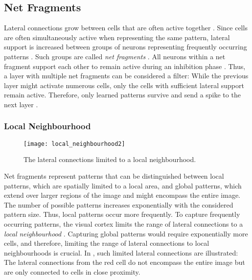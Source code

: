 \subsection{Net Fragments}
Lateral connections grow between cells that are often active together .
Since cells are often simultaneously active when representing the same pattern, lateral support is increased between groups of neurons representing frequently occurring patterns \cite{stettler_lateral_2002}. Such groups are called \emph{net fragments} .
All neurons within a net fragment support each other to remain active during an inhibition phase . 
Thus, a layer with multiple net fragments can be considered a filter: While the previous layer might activate numerous cells, only the cells with sufficient lateral support remain active. Therefore, only learned patterns survive and send a spike to the next layer \cite{von_der_malsburg_concerning_2018}.

\subsubsection{Local Neighbourhood}
\begin{figure}[h]
    \centering
    \texttt{[image: local\_neighbourhood2]}
    \caption[Lateral connections limited to a local neighbourhood]{The lateral connections limited to a local neighbourhood.}
\end{figure}
Net fragments represent patterns that can be distinguished between local patterns, which are spatially limited to a local area, and global patterns, which extend over larger regions of the image and might encompass the entire image.
The number of possible patterns increases exponentially with the considered pattern size. Thus, local patterns occur more frequently.
To capture frequently occurring patterns, the visual cortex limits the range of lateral connections to a \emph{local neighbourhood} .
Capturing global patterns would require exponentially more cells, and therefore, limiting the range of lateral connections to local neighbourhoods is crucial.
In , such limited lateral connections are illustrated: The lateral connections from the red cell do not encompass the entire image but are only connected to cells in close proximity.

